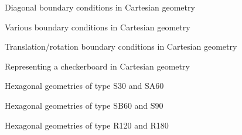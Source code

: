 \begin{figure}[!]  
\begin{center} 
\epsfxsize=13cm
\centerline{ }
\parbox{14cm}{\caption{Diagonal boundary conditions in Cartesian geometry}\label{fig:cartebc}}   
\end{center}  
\end{figure}

\begin{figure}[!]  
\begin{center} 
\epsfxsize=15cm
\centerline{ }
\parbox{14cm}{\caption{Various boundary conditions in Cartesian geometry}\label{fig:cartebcr}}   
\end{center}  
\end{figure}

\begin{figure}[!]  
\begin{center} 
\epsfxsize=10cm
\centerline{ }
\parbox{14cm}{\caption{Translation/rotation boundary conditions in Cartesian geometry}\label{fig:cartebct}}   
\end{center}  
\end{figure}

\begin{figure}[!]  
\begin{center} 
\epsfxsize=13cm
\centerline{ }
\parbox{14cm}{\caption{Representing a checkerboard in Cartesian geometry}\label{fig:cartebcdam}}   
\end{center}  
\end{figure}

\begin{figure}[!]  
\begin{center}
\epsfxsize=15cm
\centerline{ }
\parbox{14cm}{\caption{Hexagonal geometries of type S30 and SA60}\label{fig:s30}}   
\end{center}  
\end{figure}

\begin{figure}[!]  
\begin{center} 
\epsfxsize=15cm
\centerline{ }
\parbox{14cm}{\caption{Hexagonal geometries of type SB60 and S90}\label{fig:sb60}}   
\end{center}  
\end{figure}

\begin{figure}[!]  
\begin{center} 
\epsfxsize=12cm
\centerline{ }
\parbox{14cm}{\caption{Hexagonal geometries of type R120 and R180}\label{fig:r120}}   
\end{center}  
\end{figure}

